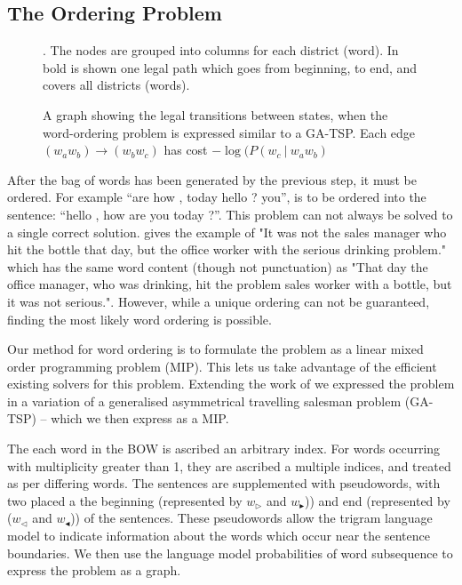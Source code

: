 \documentclass[11pt]{article}
\theoremstyle{plain}
\theoremstyle{definition}
\begin{document}
\subsection{The Ordering Problem} \label{ordering}
\begin{figure*}
	
	\caption{\label{fig:ordergraph} A graph showing the legal transitions between states, when the word-ordering problem is expressed similar to a GA-TSP. Each edge $(w_aw_b)\to (w_bw_c)$ has cost $-\log(P(w_c\:|\:w_aw_b)$}. The nodes are grouped into columns for each district (word). In bold is shown one legal path which goes from beginning, to end, and covers all districts (words). 
\end{figure*}

After the bag of words has been generated by the previous step, it must be ordered. For example “are how , today hello ? you”, is to be ordered into the sentence: “hello , how are you today ?”. This problem can not always be solved to a single correct solution. \textcite{Mitchell2008}  gives the example of "It was not the sales manager who hit the bottle that day, but the office worker with the serious drinking problem." which has the same word content (though not punctuation) as "That day the office manager, who was drinking, hit the problem sales worker with a bottle, but it was not serious.". However, while a unique ordering can not be guaranteed, finding the most likely word ordering is possible.

Our method for word ordering is to formulate the problem as a linear mixed order programming problem (MIP). This lets us take advantage of the efficient existing solvers for this problem. Extending the work of \textcite{Horvat2014} we expressed the problem in a variation of a generalised asymmetrical travelling salesman problem (GA-TSP) -- which we then express as a MIP. 

The each word in the BOW is ascribed an arbitrary index. For words occurring with multiplicity greater than 1, they are ascribed a multiple indices, and treated as per differing words. The sentences are supplemented with pseudowords, with two placed a the beginning (represented by $w_\triangleright$ and $w_\blacktriangleright$)) and end (represented by ($w_\triangleleft$ and $w_\blacktriangleleft$)) of the sentences. These pseudowords allow the trigram language model to indicate information about the words which occur near the sentence boundaries. We then use the language model probabilities of word subsequence to express the problem as a graph.
\end{document}
